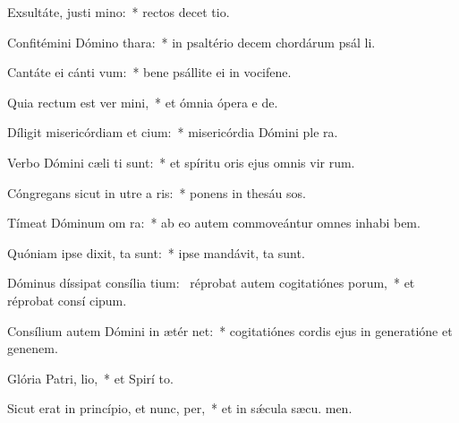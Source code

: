 \item Exsultáte, justi  mino:~* rectos decet tio.
\item Confitémini Dómino  thara:~* in psaltério decem chordárum psál li.
\item Cantáte ei cánti vum:~* bene psállite ei in vocifene.
\item Quia rectum est ver mini,~* et ómnia ópera e  de.
\item Díligit misericórdiam et cium:~* misericórdia Dómini ple  ra.
\item Verbo Dómini cæli ti sunt:~* et spíritu oris ejus omnis vir rum.
\item Cóngregans sicut in utre a ris:~* ponens in thesáu sos.
\item Tímeat Dóminum om ra:~* ab eo autem commoveántur omnes inhabi bem.
\item Quóniam ipse dixit,  ta sunt:~* ipse mandávit,  ta sunt.
\item Dóminus díssipat consília tium:~\pscross{} réprobat autem cogitatiónes porum,~* et réprobat consí cipum.
\item Consílium autem Dómini in ætér net:~* cogitatiónes cordis ejus in generatióne et genenem.
\item Glória Patri,  lio,~* et Spirí to.
\item Sicut erat in princípio, et nunc,  per,~* et in sǽcula sæcu. men.

